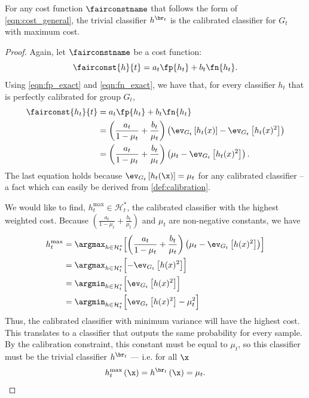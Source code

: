 \begin{lemma}
  For any cost function $\fairconstname$ that follows the form of
  \eqref{eqn:cost_general}, the trivial classifier $h^{\br_t}$ is the calibrated
  classifier for $G_t$ with maximum cost.
  \label{lma:trivial}
\end{lemma}
%
\begin{proof}
  Again, let $\fairconstname$ be a cost function:
  $$\fairconst{h}{t} = a_t \fp{h_t} + b_t \fn{h_t}.$$
  Using \eqref{eqn:fp_exact} and \eqref{eqn:fn_exact}, we have that, for every classifier $h_t$
  that is perfectly calibrated for group $G_t$,
  \begin{align*}
    \fairconst{h_t}{t} &= a_t \fp{h_t} + b_t \fn{h_t}
    \\&= \left( \frac{a_t}{1 - \mu_t} + \frac{b_t}{\mu_t} \right) \left( \ev_{G_t} \left[ h_t(x) \right] - \ev_{G_t} \left[ h_t(x)^2 \right] \right)
    \\&= \left( \frac{a_t}{1 - \mu_t} + \frac{b_t}{\mu_t} \right) \left( \mu_t - \ev_{G_t} \left[ h_t(x)^2 \right] \right).
  \end{align*}
  The last equation holds because $\ev_{G_t} \left[ h_t(\x) \right] = \mu_t$ for any calibrated
  classifier -- a fact which can easily be derived from \autoref{def:calibration}.

  We would like to find, $h^{\max}_t \in \mathcal{H}^*_t$, the calibrated classifier with the highest weighted cost.
  Because $\left( \frac{a_t}{1 - \mu_t} + \frac{b_t}{\mu_t} \right)$ and $\mu_t$ are non-negative constants, we have
  \begin{align*}
    h^{\max}_t &= \argmax_{h \in \mathcal{H}^*_t} \Bigl[ \left( \frac{a_t}{1 - \mu_t} + \frac{b_t}{\mu_t} \right) \left( \mu_t - \ev_{G_t} \left[ h(x)^2 \right] \right) \Bigr]
    \\&= \argmax_{h \in \mathcal{H}^*_t} \Bigl[ - \ev_{G_t} \left[ h(x)^2 \right] \Bigr]
    \\&= \argmin_{h \in \mathcal{H}^*_t} \Bigl[ \ev_{G_t} \left[ h(x)^2 \right] \Bigr]
    \\&= \argmin_{h \in \mathcal{H}^*_t} \Bigl[ \ev_{G_t} \left[ h(x)^2 \right] - \mu_t^2 \Bigr]
  \end{align*}
  Thus, the calibrated classifier with minimum variance will have the highest cost. This translates to
  a classifier that outputs the same probability for every sample. By the calibration constraint, this
  constant must be equal to $\mu_t$, so this classifier must be the trivial classifier $h^{\br_t}$ --- i.e.
  for all $\x$
  \[ h^{\max}_t \left( \x \right) = h^{\br_t} \left( \x \right) = \mu_t. \]
\end{proof}

